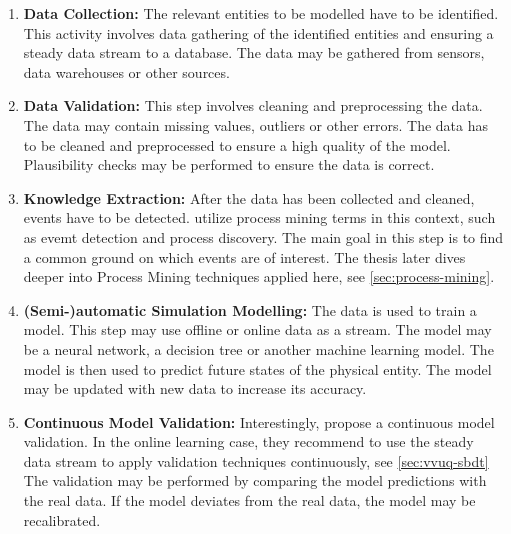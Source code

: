 \begin{enumerate}
  \item \textbf{Data Collection:} The relevant entities to be modelled have to be identified. This activity involves data gathering of the identified entities and ensuring a steady data stream to a database. The data may be gathered from sensors, data warehouses or other sources.
  \item \textbf{Data Validation:} This step involves cleaning and preprocessing the data. The data may contain missing values, outliers or other errors. The data has to be cleaned and preprocessed to ensure a high quality of the model. Plausibility checks may be performed to ensure the data is correct.
  \item \textbf{Knowledge Extraction:} After the data has been collected and cleaned, events have to be detected.  utilize process mining terms in this context, such as evemt detection and process discovery. The main goal in this step is to find a common ground on which events are of interest. The thesis later dives deeper into Process Mining techniques applied here, see \autoref{sec:process-mining}.
  \item \textbf{(Semi-)automatic Simulation Modelling:} The data is used to train a model. This step may use offline or online data as a stream. The model may be a neural network, a decision tree or another machine learning model. The model is then used to predict future states of the physical entity. The model may be updated with new data to increase its accuracy.
  \item \textbf{Continuous Model Validation:} Interestingly,\citeauthor{francis2021towards} propose a continuous model validation. In the online learning case, they recommend to use the steady data stream to apply validation techniques continuously, see \autoref{sec:vvuq-sbdt} The validation may be performed by comparing the model predictions with the real data. If the model deviates from the real data, the model may be recalibrated.
\end{enumerate}

